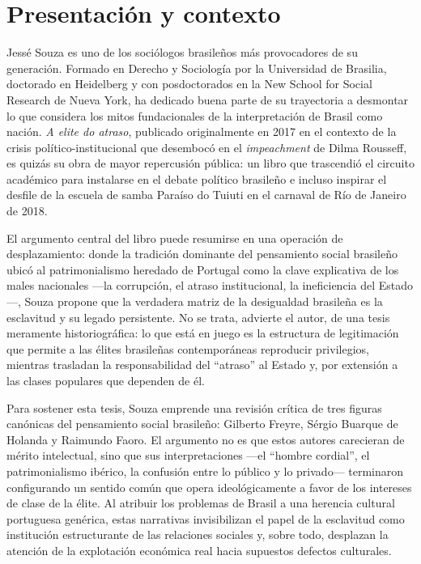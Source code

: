 \section{Presentación y contexto}
Jessé Souza es uno de los sociólogos brasileños más provocadores de su generación. Formado en Derecho y Sociología por la Universidad de Brasilia, doctorado en Heidelberg y con posdoctorados en la New School for Social Research de Nueva York, ha dedicado buena parte de su trayectoria a desmontar lo que considera los mitos fundacionales de la interpretación de Brasil como nación. \textit{A elite do atraso}, publicado originalmente en 2017 en el contexto de la crisis político-institucional que desembocó en el \textit{impeachment} de Dilma Rousseff, es quizás su obra de mayor repercusión pública: un libro que trascendió el circuito académico para instalarse en el debate político brasileño e incluso inspirar el desfile de la escuela de samba Paraíso do Tuiuti en el carnaval de Río de Janeiro de 2018.

El argumento central del libro puede resumirse en una operación de desplazamiento: donde la tradición dominante del pensamiento social brasileño ubicó al patrimonialismo heredado de Portugal como la clave explicativa de los males nacionales —la corrupción, el atraso institucional, la ineficiencia del Estado—, Souza propone que la verdadera matriz de la desigualdad brasileña es la esclavitud y su legado persistente. No se trata, advierte el autor, de una tesis meramente historiográfica: lo que está en juego es la estructura de legitimación que permite a las élites brasileñas contemporáneas reproducir privilegios, mientras trasladan la responsabilidad del “atraso” al Estado y, por extensión a las clases populares que dependen de él.

Para sostener esta tesis, Souza emprende una revisión crítica de tres figuras canónicas del pensamiento social brasileño: Gilberto Freyre, Sérgio Buarque de Holanda y Raimundo Faoro. El argumento no es que estos autores carecieran de mérito intelectual, sino que sus interpretaciones —el “hombre cordial”, el patrimonialismo ibérico, la confusión entre lo público y lo privado— terminaron configurando un sentido común que opera ideológicamente a favor de los intereses de clase de la élite. Al atribuir los problemas de Brasil a una herencia cultural portuguesa genérica, estas narrativas invisibilizan el papel de la esclavitud como institución estructurante de las relaciones sociales y, sobre todo, desplazan la atención de la explotación económica real hacia supuestos defectos culturales.

